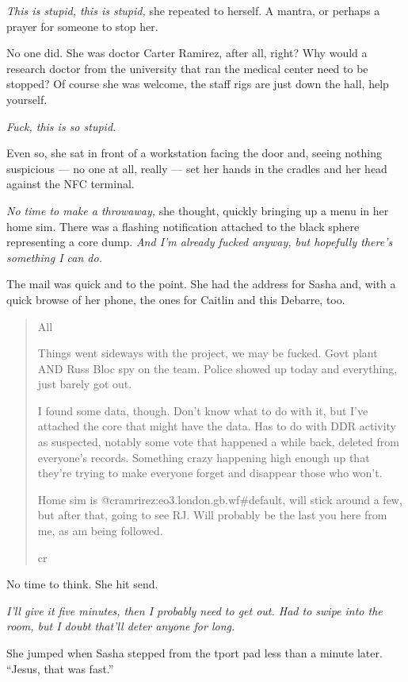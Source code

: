 \emph{This is stupid, this is stupid,} she repeated to herself. A mantra, or perhaps a prayer for someone to stop her.

No one did. She was doctor Carter Ramirez, after all, right? Why would a research doctor from the university that ran the medical center need to be stopped? Of course she was welcome, the staff rigs are just down the hall, help yourself.

\emph{Fuck, this is so stupid.}

Even so, she sat in front of a workstation facing the door and, seeing nothing suspicious — no one at all, really — set her hands in the cradles and her head against the NFC terminal.

\emph{No time to make a throwaway,} she thought, quickly bringing up a menu in her home sim. There was a flashing notification attached to the black sphere representing a core dump. \emph{And I'm already fucked anyway, but hopefully there's something I can do.}

The mail was quick and to the point. She had the address for Sasha and, with a quick browse of her phone, the ones for Caitlin and this Debarre, too.

\begin{quote}
All

Things went sideways with the project, we may be fucked. Govt plant AND Russ Bloc spy on the team. Police showed up today and everything, just barely got out.

I found some data, though. Don't know what to do with it, but I've attached the core that might have the data. Has to do with DDR activity as suspected, notably some vote that happened a while back, deleted from everyone's records. Something crazy happening high enough up that they're trying to make everyone forget and disappear those who won't.

Home sim is @cramrirez:eo3.london.gb.wf\#default, will stick around a few, but after that, going to see RJ. Will probably be the last you here from me, as am being followed.

cr
\end{quote}

No time to think. She hit send.

\emph{I'll give it five minutes, then I probably need to get out. Had to swipe into the room, but I doubt that'll deter anyone for long.}

She jumped when Sasha stepped from the tport pad less than a minute later. ``Jesus, that was fast.''

